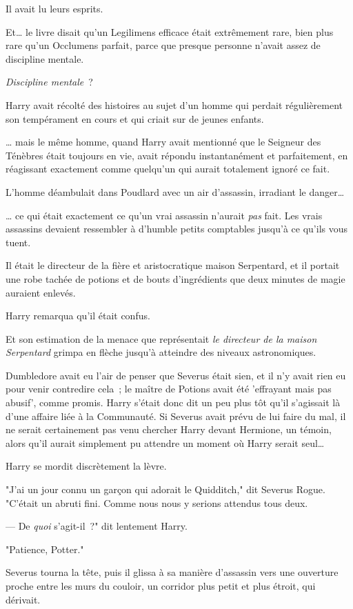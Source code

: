 Il avait lu leurs esprits.

Et… le livre disait qu'un Legilimens efficace était extrêmement rare, bien plus rare qu'un Occlumens parfait, parce que presque personne n'avait assez de discipline mentale.

\emph{Discipline mentale}~?

Harry avait récolté des histoires au sujet d'un homme qui perdait régulièrement son tempérament en cours et qui criait sur de jeunes enfants.

… mais le même homme, quand Harry avait mentionné que le Seigneur des Ténèbres était toujours en vie, avait répondu instantanément et parfaitement, en réagissant exactement comme quelqu'un qui aurait totalement ignoré ce fait.

L'homme déambulait dans Poudlard avec un air d'assassin, irradiant le danger…

… ce qui était exactement ce qu'un vrai assassin n'aurait \emph{pas} fait. Les vrais assassins devaient ressembler à d'humble petits comptables jusqu'à ce qu'ils vous tuent.

Il était le directeur de la fière et aristocratique maison Serpentard, et il portait une robe tachée de potions et de bouts d'ingrédients que deux minutes de magie auraient enlevés.

Harry remarqua qu'il était confus.

Et son estimation de la menace que représentait \emph{le directeur de la maison Serpentard} grimpa en flèche jusqu'à atteindre des niveaux astronomiques.

Dumbledore avait eu l'air de penser que Severus était sien, et il n'y avait rien eu pour venir contredire cela~; le maître de Potions avait été 'effrayant mais pas abusif', comme promis. Harry s'était donc dit un peu plus tôt qu'il s'agissait là d'une affaire liée à la Communauté. Si Severus avait prévu de lui faire du mal, il ne serait certainement pas venu chercher Harry devant Hermione, un témoin, alors qu'il aurait simplement pu attendre un moment où Harry serait seul…

Harry se mordit discrètement la lèvre.

"J'ai un jour connu un garçon qui adorait le Quidditch," dit Severus Rogue. "C'était un abruti fini. Comme nous nous y serions attendus tous deux.

--- De \emph{quoi} s'agit-il~?" dit lentement Harry.

"Patience, Potter."

Severus tourna la tête, puis il glissa à sa manière d'assassin vers une ouverture proche entre les murs du couloir, un corridor plus petit et plus étroit, qui dérivait.

